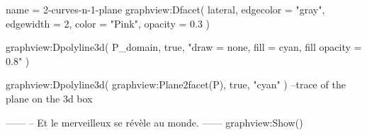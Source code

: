 \documentclass[border = 3pt]{standalone}
\begin{document}
\begin{luadraw}{name = 2-curves-n-1-plane}
    graphview:Dfacet(
        lateral,
        {
            edgecolor = "gray",
            edgewidth = 2,
            color     = "Pink",
            opacity   = 0.3
        })

    graphview:Dpolyline3d(
        P_domain,
        true,
        "draw = none, fill = cyan, fill opacity = 0.8"
    )

    graphview:Dpolyline3d(
        graphview:Plane2facet(P),
        true,
        "cyan"
     ) --trace of the plane on the 3d box

------
-- Et le merveilleux se révèle au monde.
------
    graphview:Show()
\end{luadraw}
\end{document}
